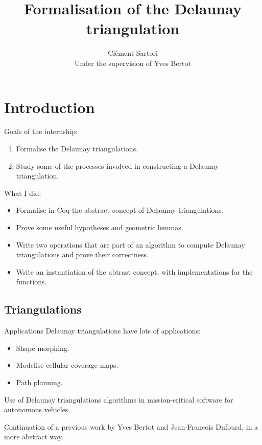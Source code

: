 \documentclass[18pt]{beamer}
\begin{document}
\title{Formalisation of the Delaunay triangulation}
\author{Clément Sartori\\ Under the supervision of Yves Bertot}
\begin{frame}
 \maketitle
 \end{frame}

\section{Introduction}

\begin{frame}
 Goals of the internship:
 \begin{enumerate}
  \item<1-> Formalise the Delaunay triangulations.
  \item<2-> Study some of the processes involved in constructing a Delaunay triangulation.
 \end{enumerate}
\begin{overprint}
 What I did:
 \begin{itemize}
 \item<4-> Formalise in Coq the abstract concept of Delaunay triangulations.
 \item<5-> Prove some useful hypotheses and geometric lemmas.
 \item<6-> Write two operations that are part of an algorithm to compute Delaunay triangulations and prove their correctness.
 \item<7-> Write an instantiation of the abtrast concept, with implementations for the functions.
 \end{itemize}
\end{overprint}

\end{frame}

\subsection{Triangulations}
\begin{frame}{Applications}
 Delaunay triangulations have lots of applications:
 \begin{itemize}
  \item<1,2,3,4> Shape morphing.
  \item<2,3,4> Modelise cellular coverage maps.
  \item<3,4> Path planning.
 \end{itemize}

Use of Delaunay triangulations algorithms in mission-critical software for autonomous vehicles.

 \vspace{0.3cm}
 
Continuation of a previous work by Yves Bertot and Jean-Francois Dufourd, in a more abstract way.

\end{frame}
\end{document}

